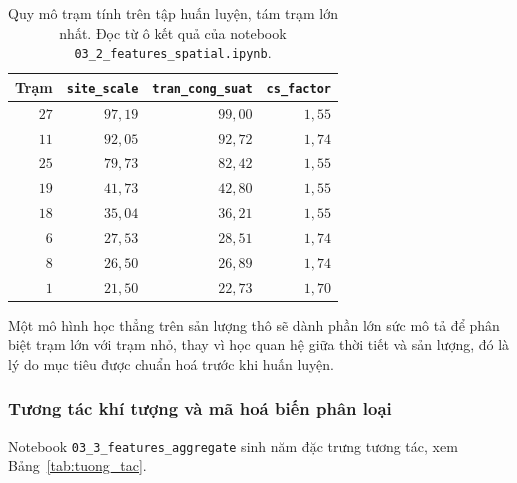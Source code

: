 \documentclass[12pt, a4paper]{report}
\begin{document}
\begin{table}[htbp]
\centering
\caption{Quy mô trạm tính trên tập huấn luyện, tám trạm lớn nhất. Đọc từ ô kết quả của
notebook \texttt{03\_2\_features\_spatial.ipynb}.}
\label{tab:quy_mo}
\small
\begin{tabular}{r r r r}
\toprule
\textbf{Trạm} & \texttt{site\_scale} & \texttt{tran\_cong\_suat} & \texttt{cs\_factor} \\
\midrule
$27$ & $97{,}19$ & $99{,}00$ & $1{,}55$ \\
$11$ & $92{,}05$ & $92{,}72$ & $1{,}74$ \\
$25$ & $79{,}73$ & $82{,}42$ & $1{,}55$ \\
$19$ & $41{,}73$ & $42{,}80$ & $1{,}55$ \\
$18$ & $35{,}04$ & $36{,}21$ & $1{,}55$ \\
$6$  & $27{,}53$ & $28{,}51$ & $1{,}74$ \\
$8$  & $26{,}50$ & $26{,}89$ & $1{,}74$ \\
$1$  & $21{,}50$ & $22{,}73$ & $1{,}70$ \\
\bottomrule
\end{tabular}
\end{table}

Một mô hình học thẳng trên sản lượng thô sẽ dành phần lớn sức mô tả để phân biệt trạm lớn với trạm nhỏ, thay vì học quan hệ
giữa thời tiết và sản lượng, đó là lý do mục tiêu được chuẩn hoá trước khi huấn luyện.

\subsubsection{Tương tác khí tượng và mã hoá biến phân loại}

Notebook \texttt{03\_3\_features\_aggregate} sinh năm đặc trưng tương tác, xem
Bảng~\ref{tab:tuong_tac}.
\end{document}
